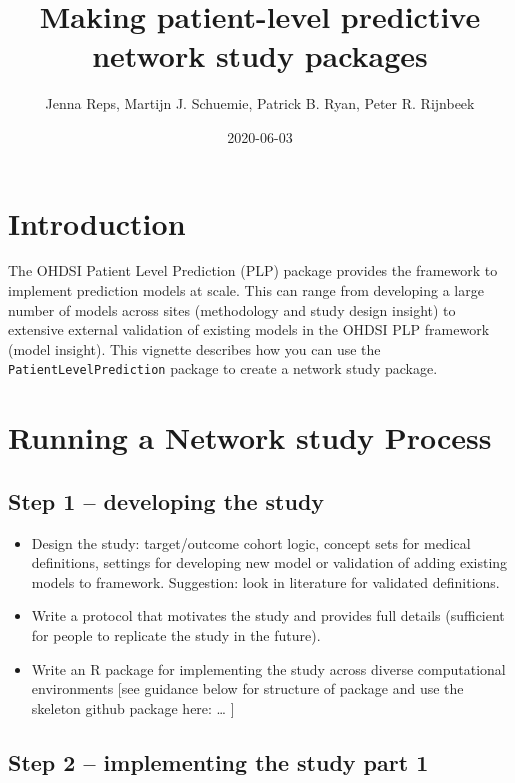 \documentclass[
]{article}
\title{Making patient-level predictive network study packages}
\author{Jenna Reps, Martijn J. Schuemie, Patrick B. Ryan, Peter R. Rijnbeek}
\date{2020-06-03}
\providecommand{\tightlist}{%
  \setlength{\itemsep}{0pt}\setlength{\parskip}{0pt}}
\begin{document}
\maketitle

{
\setcounter{tocdepth}{2}
\tableofcontents
}
\newpage

\hypertarget{introduction}{%
\section{Introduction}\label{introduction}}

The OHDSI Patient Level Prediction (PLP) package provides the framework
to implement prediction models at scale. This can range from developing
a large number of models across sites (methodology and study design
insight) to extensive external validation of existing models in the
OHDSI PLP framework (model insight). This vignette describes how you can
use the \texttt{PatientLevelPrediction} package to create a network
study package.

\hypertarget{running-a-network-study-process}{%
\section{Running a Network study
Process}\label{running-a-network-study-process}}

\hypertarget{step-1-developing-the-study}{%
\subsection{Step 1 -- developing the
study}\label{step-1-developing-the-study}}

\begin{itemize}
\tightlist
\item
  Design the study: target/outcome cohort logic, concept sets for
  medical definitions, settings for developing new model or validation
  of adding existing models to framework. Suggestion: look in literature
  for validated definitions.
\item
  Write a protocol that motivates the study and provides full details
  (sufficient for people to replicate the study in the future).
\item
  Write an R package for implementing the study across diverse
  computational environments {[}see guidance below for structure of
  package and use the skeleton github package here: \ldots{} {]}
\end{itemize}

\hypertarget{step-2-implementing-the-study-part-1}{%
\subsection{Step 2 -- implementing the study part
1}\label{step-2-implementing-the-study-part-1}}
\end{document}
